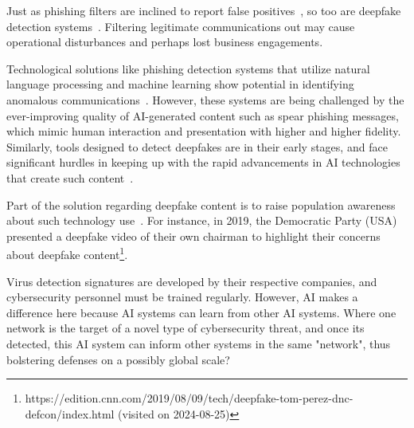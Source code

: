 Just as phishing filters are inclined to report false positives~\citep{fakhouri_AI_Driven_Solutions_SE_Attacks_2024}, so too are deepfake detection systems~\citep{mirsky_Creation_Detection_Deepfakes_2021}. Filtering legitimate communications out may cause operational disturbances and perhaps lost business engagements.

Technological solutions like phishing detection systems that utilize natural language processing and machine learning show potential in identifying anomalous communications~\citep{basit_Comprehensive_Survey_AI_Phishing_Detection_2021}. However, these systems are being challenged by the ever-improving quality of AI-generated content such as spear phishing messages, which mimic human interaction and presentation with higher and higher fidelity. Similarly, tools designed to detect deepfakes are in their early stages, and face significant hurdles in keeping up with the rapid advancements in AI technologies that create such content~\citep{mirsky_Creation_Detection_Deepfakes_2021}.



Part of the solution regarding deepfake content is to raise population awareness about such technology use~\citep{blauth_AI_Crime_Overview_Malicious_Use_Abuse_2022}. For instance, in 2019, the Democratic Party (USA) presented a deepfake video of their own chairman to highlight their concerns about deepfake content\footnote{https://edition.cnn.com/2019/08/09/tech/deepfake-tom-perez-dnc-defcon/index.html (visited on 2024-08-25)}.

Virus detection signatures are developed by their respective companies, and cybersecurity personnel must be trained regularly. However, AI makes a difference here because AI systems can learn from other AI systems. Where one network is the target of a novel type of cybersecurity threat, and once its detected, this AI system can inform other systems in the same "network", thus bolstering defenses on a possibly global scale?


